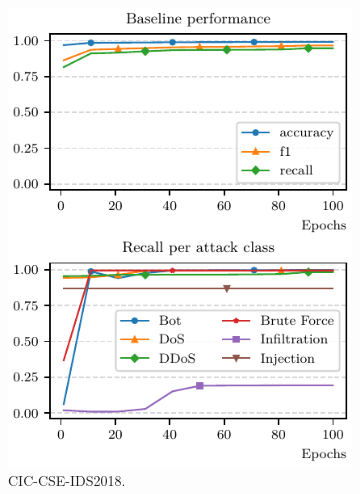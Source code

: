 \begin{figure}[t]
  \centering
  \begin{subfigure}{.45\linewidth}
    \centering
    \includegraphics[width=\linewidth]{figures/cicids/baseline}
    \caption{
      CIC-CSE-IDS2018.
      \label{fig:assess.baseline.cicids}
    }
  \end{subfigure}
  \hfill
  \begin{subfigure}{.45\linewidth}
    \centering

\end{subfigure}
\end{figure}
